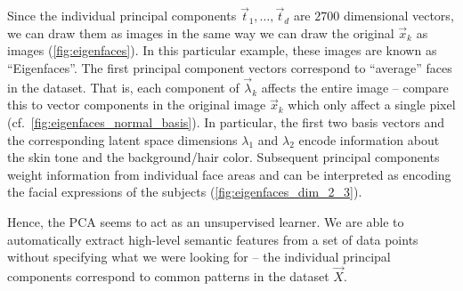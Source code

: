 \documentclass[10pt,letterpaper,oneside]{article}
\begin{document}
Since the individual principal components $\vec t_1, \ldots, \vec t_d$ are $2700$ dimensional vectors, we can draw them as images in the same way we can draw the original $\vec x_k$ as images (\cref{fig:eigenfaces}). In this particular example, these images are known as \enquote{Eigenfaces}. The first principal component vectors correspond to \enquote{average} faces in the dataset. That is, each component of $\vec \lambda_k$ affects the entire image -- compare this to vector components in the original image $\vec x_k$ which only affect a single pixel (cf.~\cref{fig:eigenfaces_normal_basis}). In particular, the first two basis vectors and the corresponding latent space dimensions $\lambda_1$ and $\lambda_2$ encode information about the skin tone and the background/hair color. Subsequent principal components weight information from individual face areas and can be interpreted as encoding the facial expressions of the subjects (\cref{fig:eigenfaces_dim_2_3}).

Hence, the PCA seems to act as an unsupervised learner. We are able to automatically extract high-level semantic features from a set of data points without specifying what we were looking for -- the individual principal components correspond to common patterns in the dataset $\vec X$.

\newpage


\end{document}
